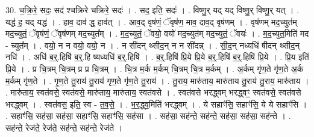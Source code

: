 \documentclass[17pt]{extarticle}
\begin{document}
30. च॒क्रि॒रे॒ सदः॒ सद॑ श्चक्रिरे चक्रिरे॒ सदः॑ । . सद॒ इति॒ सदः॑ । . विष्णु॒र् यद् यद् विष्णु॒र् विष्णु॒र् यत् । . यद्ध॑ ह॒ यद् यद्ध॑ । . हाव॒ दाव॑ द्ध॒ हाव॑त् । . आव॒द् वृष॑णं॒ ॅवृष॑ण॒ माव॒ दाव॒द् वृष॑णम् । . वृष॑णम् मद॒च्युत॑म् मद॒च्युतं॒ ॅवृष॑णं॒ ॅवृष॑णम् मद॒च्युत᳚म् । . म॒द॒च्युतं॒ ॅवयो॒ वयो॑ मद॒च्युत॑म् मद॒च्युतं॒ ॅवयः॑ । . म॒द॒च्युत॒मिति॑ मद - च्युत᳚म् । . वयो॒ न न वयो॒ वयो॒ न । . न सी॑दन् थ्सीद॒न् न न सी॑दन्न् । . सी॒द॒न् नध्यधि॑ षीदन् थ्सीद॒न् नधि॑ । . अधि॑ ब॒र्॒.हिषि॑ ब॒र्॒.हि ष्यध्यधि॑ ब॒र्॒.हिषि॑ । . ब॒र्॒.हिषि॑ प्रि॒ये प्रि॒ये ब॒र्॒.हिषि॑ ब॒र्॒.हिषि॑ प्रि॒ये । . प्रि॒य इति॑ प्रि॒ये । . प्र चि॒त्रम् चि॒त्रम् प्र प्र चि॒त्रम् । . चि॒त्र म॒र्क म॒र्कम् चि॒त्रम् चि॒त्र म॒र्कम् । . अ॒र्कम् गृ॑ण॒ते गृ॑ण॒ते अ॒र्क म॒र्कम् गृ॑ण॒ते । . गृ॒ण॒ते तु॒राय॑ तु॒राय॑ गृण॒ते गृ॑ण॒ते तु॒राय॑ । . तु॒राय॒ मारु॑ताय॒ मारु॑ताय तु॒राय॑ तु॒राय॒ मारु॑ताय । . मारु॑ताय॒ स्वत॑वसे॒ स्वत॑वसे॒ मारु॑ताय॒ मारु॑ताय॒ स्वत॑वसे । . स्वत॑वसे भरद्ध्वम् भरद्ध्वꣳ॒॒ स्वत॑वसे॒ स्वत॑वसे भरद्ध्वम् । . स्वत॑वस॒ इति॒ स्व - त॒व॒से॒ । . भ॒र॒द्ध्व॒मिति॑ भरद्ध्वम् । . ये सहाꣳ॑सि॒ सहाꣳ॑सि॒ ये ये सहाꣳ॑सि । . सहाꣳ॑सि॒ सह॑सा॒ सह॑सा॒ सहाꣳ॑सि॒ सहाꣳ॑सि॒ सह॑सा । . सह॑सा॒ सह॑न्ते॒ सह॑न्ते॒ सह॑सा॒ सह॑सा॒ सह॑न्ते । . सह॑न्ते॒ रेज॑ते॒ रेज॑ते॒ सह॑न्ते॒ सह॑न्ते॒ रेज॑ते । \newline
\end{document}
